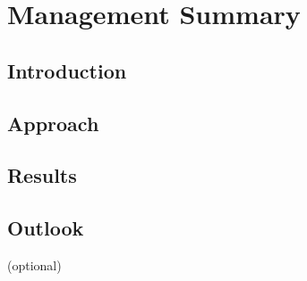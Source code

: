 \chapter{Management Summary}
\section{Introduction}

\section{Approach}

\section{Results}

\section{Outlook}
(optional)
